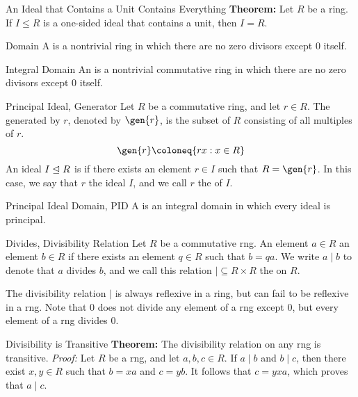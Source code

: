 \begin{thmbox}{An Ideal that Contains a Unit Contains Everything}
	\textbf{Theorem:} Let $R$ be a ring. If $I \le R$ is a one-sided ideal that contains a unit, then $I = R$.
\end{thmbox}



\begin{dfnbox}{Domain}
	A  is a nontrivial ring in which there are no zero divisors except $0$ itself.
\end{dfnbox}

\begin{dfnbox}{Integral Domain}
	An  is a nontrivial commutative ring in which there are no zero divisors except $0$ itself.
\end{dfnbox}

\begin{dfnbox}{Principal Ideal, Generator}
	Let $R$ be a commutative ring, and let $r \in R$. The  generated by $r$, denoted by $\gen{r}$, is the subset of $R$ consisting of all multiples of $r$.
	\[ \gen{r} \coloneq \{ rx : x \in R \} \]
	An ideal $I \trianglelefteq R$ is  if there exists an element $r \in I$ such that $R = \gen{r}$. In this case, we say that $r$  the ideal $I$, and we call $r$ the  of $I$.
\end{dfnbox}

\begin{dfnbox}{Principal Ideal Domain, PID}
	A  is an integral domain in which every ideal is principal.
\end{dfnbox}

\begin{dfnbox}{Divides, Divisibility Relation}
	Let $R$ be a commutative rng. An element $a \in R$  an element $b \in R$ if there exists an element $q \in R$ such that $b = qa$. We write $a \mid b$ to denote that $a$ divides $b$, and we call this relation ${\mid} \subseteq R \times R$ the  on $R$.
\end{dfnbox}

The divisibility relation $\mid$ is always reflexive in a ring, but can fail to be reflexive in a rng. Note that $0$ does not divide any element of a rng except $0$, but every element of a rng divides $0$.

\begin{thmbox}{Divisibility is Transitive}
	\textbf{Theorem:} The divisibility relation on any rng is transitive.
\tcblower
	\textit{Proof:} Let $R$ be a rng, and let $a, b, c \in R$. If $a \mid b$ and $b \mid c$, then there exist $x, y \in R$ such that $b = xa$ and $c = yb$. It follows that $c = yxa$, which proves that $a \mid c$.
\end{thmbox}

